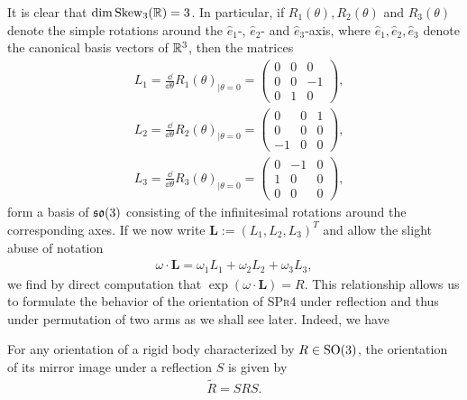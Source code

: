 It is clear that $\dim \operatorname{Skew}_3(\mathbb{R}) = 3$. In particular, if $R_1(\theta), R_2(\theta)$ and $R_3(\theta)$ denote the simple rotations around the $\hat{e}_1$-, $\hat{e}_2$- and $\hat{e}_3$-axis, where $\hat{e}_1, \hat{e}_2, \hat{e}_3$ denote the canonical basis vectors of $\mathbb{R}^3$, then the matrices
\begin{align}
\label{eq: L1}
	&L_1 = \frac{\dd}{\dd\theta}R_1(\theta)_{\mid \theta =0} = \left(\begin{array}{ccc}
	0 & 0 & 0 \\ 
	0 & 0 & -1 \\ 
	0 & 1 & 0
	\end{array}  \right ),\\
\label{eq: L2}
	&L_2 = \frac{\dd}{\dd\theta}R_2(\theta)_{\mid \theta =0} = \left (\begin{array}{ccc}
	0 & 0 & 1 \\ 
	0 & 0 & 0 \\ 
	-1 & 0 & 0
	\end{array}  \right ),\\
\label{eq: L3}
	&L_3 = \frac{\dd}{\dd\theta}R_3(\theta)_{\mid \theta =0} = \left (\begin{array}{ccc}
	0 & -1 & 0 \\ 
	1 & 0 & 0 \\ 
	0 & 0 & 0
	\end{array}  \right ),
\end{align}
form a basis of $\mathfrak{so}(3)$ consisting of the infinitesimal rotations around the corresponding axes. If we now write $\textbf{L} := (L_1, L_2, L_3)^T$ and allow the slight abuse of notation
\begin{align}
	\omega \cdot \mathbf{L} = \omega_1 L_1 + \omega_2 L_2 + \omega_3 L_3,
\end{align}
we find by direct computation that $\exp(\omega \cdot \mathbf{L}) = R$. This relationship allows us to formulate the behavior of the orientation of \textsc{SPr4} under reflection and thus under permutation of two arms as we shall see later. Indeed, we have

\begin{lemma}
\label{lem:mirror image of orientation}
For any orientation of a rigid body characterized by $R \in \operatorname{SO}(3)$, the orientation of its mirror image under a reflection $S$ is given by
\begin{align}
	\tilde{R} = S R S.
\end{align}
\end{lemma}

